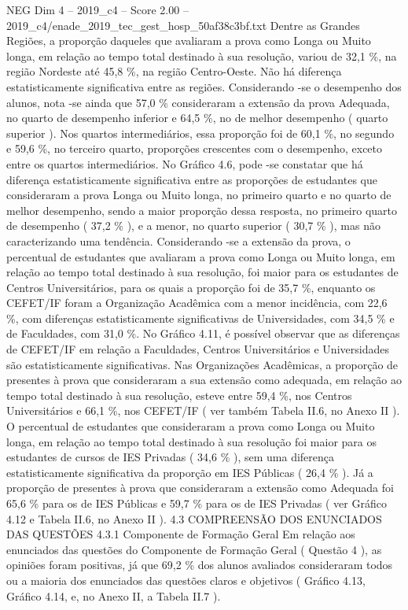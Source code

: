 \begin{textsample}{NEG Dim 4 – 2019\_c4 – Score 2.00 – 2019\_c4/enade\_2019\_tec\_gest\_hosp\_50af38c3bf.txt}
Dentre as Grandes Regiões, a proporção daqueles que avaliaram a prova como Longa ou Muito longa, em relação ao tempo total destinado à sua resolução, variou de 32,1 \%, na região Nordeste até 45,8 \%, na região Centro-Oeste.
Não há diferença estatisticamente significativa entre as regiões.
Considerando -se o desempenho dos alunos, nota -se ainda que 57,0 \% consideraram a extensão da prova Adequada, no quarto de desempenho inferior e 64,5 \%, no de melhor desempenho ( quarto superior ).
Nos quartos intermediários, essa proporção foi de 60,1 \%, no segundo e 59,6 \%, no terceiro quarto, proporções crescentes com o desempenho, exceto entre os quartos intermediários.
No Gráfico 4.6, pode -se constatar que há diferença estatisticamente significativa entre as proporções de estudantes que consideraram a prova Longa ou Muito longa, no primeiro quarto e no quarto de melhor desempenho, sendo a maior proporção dessa resposta, no primeiro quarto de desempenho ( 37,2 \% ), e a menor, no quarto superior ( 30,7 \% ), mas não caracterizando uma tendência.
Considerando -se a extensão da prova, o percentual de estudantes que avaliaram a prova como Longa ou Muito longa, em relação ao tempo total destinado à sua resolução, foi maior para os estudantes de Centros Universitários, para os quais a proporção foi de 35,7 \%, enquanto os CEFET/IF foram a Organização Acadêmica com a menor incidência, com 22,6 \%, com diferenças estatisticamente significativas de Universidades, com 34,5 \% e de Faculdades, com 31,0 \%.
No Gráfico 4.11, é possível observar que as diferenças de CEFET/IF em relação a Faculdades, Centros Universitários e Universidades são estatisticamente significativas.
Nas Organizações Acadêmicas, a proporção de presentes à prova que consideraram a sua extensão como adequada, em relação ao tempo total destinado à sua resolução, esteve entre 59,4 \%, nos Centros Universitários e 66,1 \%, nos CEFET/IF ( ver também Tabela II.6, no Anexo II ).
O percentual de estudantes que consideraram a prova como Longa ou Muito longa, em relação ao tempo total destinado à sua resolução foi maior para os estudantes de cursos de IES Privadas ( 34,6 \% ), sem uma diferença estatisticamente significativa da proporção em IES Públicas ( 26,4 \% ).
Já a proporção de presentes à prova que consideraram a extensão como Adequada foi 65,6 \% para os de IES Públicas e 59,7 \% para os de IES Privadas ( ver Gráfico 4.12 e Tabela II.6, no Anexo II ). 4.3 COMPREENSÃO DOS ENUNCIADOS DAS QUESTÕES 4.3.1 Componente de Formação Geral Em relação aos enunciados das questões do Componente de Formação Geral ( Questão 4 ), as opiniões foram positivas, já que 69,2 \% dos alunos avaliados consideraram todos ou a maioria dos enunciados das questões claros e objetivos ( Gráfico 4.13, Gráfico 4.14, e, no Anexo II, a Tabela II.7 ).

\end{textsample}
